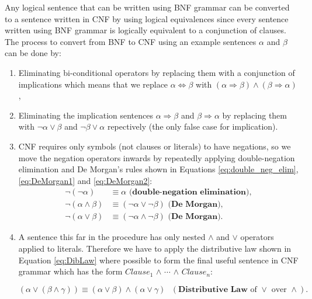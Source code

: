 Any logical sentence that can be written using BNF grammar can be converted to a sentence written in CNF by using logical equivalences since every sentence written using BNF grammar is logically equivalent to a conjunction of clauses. The process to convert from BNF to CNF using an example sentences $\alpha$ and $\beta$ can be done by:
\begin{enumerate}

	\item Eliminating bi-conditional operators by replacing them with a conjunction of implications which means that we replace $\alpha \Leftrightarrow \beta$ with $(\alpha \Rightarrow \beta) \wedge (\beta \Rightarrow \alpha)$, 
	
	\item Eliminating the implication sentences $\alpha \Rightarrow \beta$ and $\beta \Rightarrow \alpha$ by replacing them with $\neg \alpha \vee \beta$ and $\neg \beta \vee \alpha$ repectively (the only false case for implication). 
	
	\item CNF requires only symbols (not clauses or literals) to have negations, so we move the negation operators inwards by repeatedly applying double-negation elimination and De Morgan's rules shown in Equations \ref{eq:double_neg_elim}, \ref{eq:DeMorgan1} and \ref{eq:DeMorgan2}:
\begin{subequations}
\begin{align}
    \neg (\neg \alpha) & \equiv \alpha \textbf{    (double-negation elimination)}, \label{eq:double_neg_elim}\\
       \neg(\alpha \wedge \beta) & \equiv (\neg \alpha \vee \neg \beta) \textbf{    (De Morgan)}, \label{eq:DeMorgan1}\\
       \neg(\alpha \vee \beta) &\equiv (\neg \alpha \wedge \neg \beta) \textbf{    (De Morgan)}. \label{eq:DeMorgan2}
\end{align}
\end{subequations}

\item A sentence this far in the procedure has only nested $\wedge$ and $\vee$ operators applied to literals. Therefore we have to apply the distributive law shown in Equation \ref{eq:DibLaw} where possible to form the final useful sentence in CNF grammar which has the form $Clause_1$ $\wedge$ $\cdots$  $\wedge$ $Clause_n$:

\begin{equation}
       (\alpha \vee (\beta \wedge \gamma) ) \equiv  (\alpha \vee \beta)  \wedge (\alpha \vee \gamma)   \text{  }(\textbf{Distributive Law} \text{ of } \vee \text{ over } \wedge). \label{eq:DibLaw}
\end{equation}
\end{enumerate}

